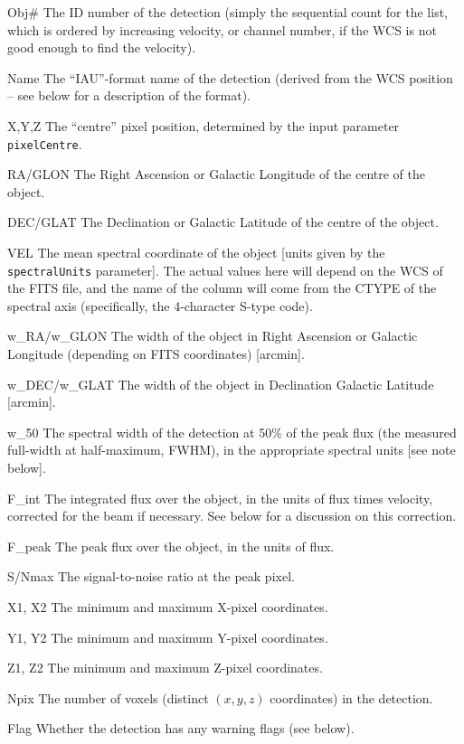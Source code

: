 \begin{Lentry}
\item[{Obj\#}] The ID number of the detection (simply the
  sequential count for the list, which is ordered by increasing
  velocity, or channel number, if the WCS is not good enough to find
  the velocity).
\item[{Name}] The ``IAU''-format name of the detection (derived from the
  WCS position -- see below for a description of the format).
\item[{X,Y,Z}] The ``centre'' pixel position, determined by the input
  parameter \texttt{pixelCentre}.
\item[{RA/GLON}] The Right Ascension or Galactic Longitude of the centre
  of the object.
\item[{DEC/GLAT}] The Declination or Galactic Latitude of the centre of
  the object.
\item[{VEL}] The mean spectral coordinate of the object [units given by the
  \texttt{spectralUnits} parameter]. The actual values here will
  depend on the WCS of the FITS file, and the name of the column will
  come from the CTYPE of the spectral axis (specifically, the
  4-character S-type code).
\item[{w\_RA/w\_GLON}] The width of the object in Right Ascension or
  Galactic Longitude (depending on FITS coordinates) [arcmin].
\item[{w\_DEC/w\_GLAT}] The width of the object in Declination Galactic
  Latitude [arcmin].
\item[{w\_50}] The spectral width of the detection at 50\% of the peak
  flux (the measured full-width at half-maximum, FWHM), in the
  appropriate spectral units [see note below].
\item[{F\_int}] The integrated flux over the object, in the units of
  flux times velocity, corrected for the beam if necessary. See below
  for a discussion on this correction.
\item[{F\_peak}] The peak flux over the object, in the units of flux.
\item[{S/Nmax}] The signal-to-noise ratio at the peak pixel.
\item[{X1, X2}] The minimum and maximum X-pixel coordinates.
\item[{Y1, Y2}] The minimum and maximum Y-pixel coordinates.
\item[{Z1, Z2}] The minimum and maximum Z-pixel coordinates.
\item[{Npix}] The number of voxels (\ie distinct $(x,y,z)$ coordinates)
  in the detection.
\item[{Flag}] Whether the detection has any warning flags (see below).
\end{Lentry}

